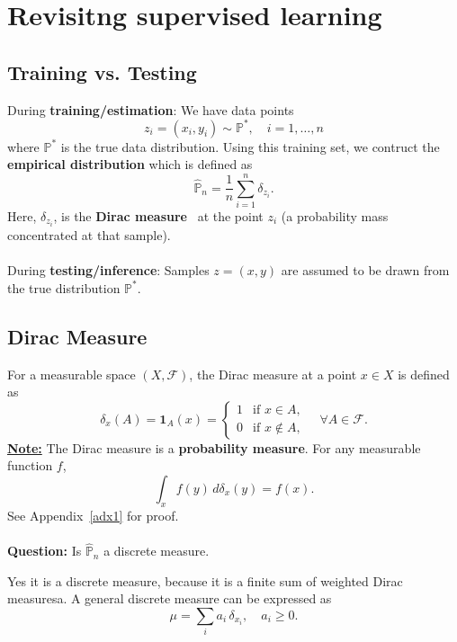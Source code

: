 \documentclass[11pt]{report}
\begin{document}

\maketitle



\section{Revisitng supervised learning}
\subsection{Training vs. Testing}
During \textbf{training/estimation}: We have data points
\[
    z_i = (x_i, y_i) \sim \mathbb{P^*}, \quad i = 1, \dots, n
\] 
where $\mathbb{P^*}$ is the true data distribution. Using this training set, we contruct the \textbf{empirical distribution} which is defined as
\[
    \hat{\mathbb{P}}_n = \frac{1}{n} \sum_{i=1}^n \delta_{z_i}.
\]
Here, $\delta_{z_i}$, is the \textbf{Dirac measure}~\cite{lax2014functional} at the point $z_i$ (a probability mass concentrated at that sample).
\\
\\
During \textbf{testing/inference}: Samples $z=(x,y)$ are assumed to be drawn from the true distribution $\mathbb{P^*}$.

\subsection{Dirac Measure}
For a measurable space $(X, \mathcal{F})$, the Dirac measure at a point $x \in X$ is defined as
\[
    \delta_x(A) = \mathbf{1}_A(x) = 
    \begin{cases}
        1 & \text{if } x \in A, \\
        0 & \text{if } x \notin A,
    \end{cases}
    \quad \forall A \in \mathcal{F}.
\]
\underline{\textbf{Note:}} The Dirac measure is a \textbf{probability measure}. For any measurable function $f$,
\[
    \int_{x} f(y)\, d\delta_x(y) = f(x).
\]
See Appendix~\ref{adx1} for proof.\\ \\
\textbf{Question:} Is $\hat{\mathbb{P}}_n$ a discrete measure.

Yes it is a discrete measure, because it is a finite sum of weighted Dirac measuresa. A general discrete measure can be expressed as
\[
    \mu = \sum_{i} a_i \, \delta_{x_i}, \quad a_i \geq 0.
\]
\end{document}
